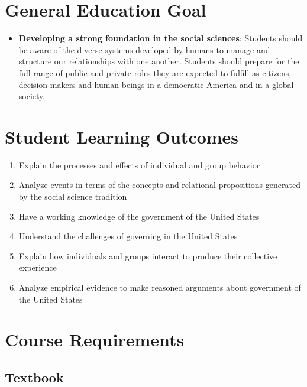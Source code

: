 \documentclass[11pt,]{article}
\providecommand{\tightlist}{%
  \setlength{\itemsep}{0pt}\setlength{\parskip}{0pt}}
\begin{document}
\hypertarget{general-education-goal}{%
\section{General Education Goal}\label{general-education-goal}}

\begin{itemize}
\tightlist
\item
  \textbf{Developing a strong foundation in the social sciences}:
  Students should be aware of the diverse systems developed by humans to
  manage and structure our relationships with one another. Students
  should prepare for the full range of public and private roles they are
  expected to fulfill as citizens, decision-makers and human beings in a
  democratic America and in a global society.
\end{itemize}

\hypertarget{student-learning-outcomes}{%
\section{Student Learning Outcomes}\label{student-learning-outcomes}}

\begin{enumerate}
\def\labelenumi{\arabic{enumi}.}
\item
  Explain the processes and effects of individual and group behavior
\item
  Analyze events in terms of the concepts and relational propositions
  generated by the social science tradition
\item
  Have a working knowledge of the government of the United States
\item
  Understand the challenges of governing in the United States
\item
  Explain how individuals and groups interact to produce their
  collective experience
\item
  Analyze empirical evidence to make reasoned arguments about government
  of the United States
\end{enumerate}

\clearpage

\hypertarget{course-requirements}{%
\section{Course Requirements}\label{course-requirements}}

\hypertarget{textbook}{%
\subsection{Textbook}\label{textbook}}
\end{document}
